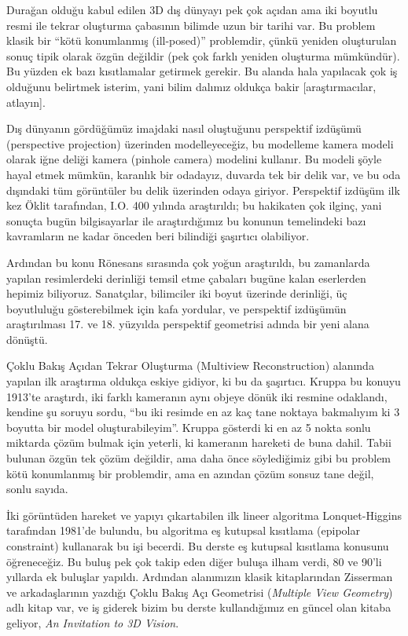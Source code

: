 \documentclass[12pt,fleqn]{article}\usepackage{../../common}
\begin{document}
Durağan olduğu kabul edilen 3D dış dünyayı pek çok açıdan ama iki boyutlu
resmi ile tekrar oluşturma çabasının bilimde uzun bir tarihi var. Bu
problem klasik bir ``kötü konumlanmış (ill-posed)'' problemdir, çünkü
yeniden oluşturulan sonuç tipik olarak özgün değildir (pek çok farklı
yeniden oluşturma mümkündür). Bu yüzden ek bazı kısıtlamalar getirmek
gerekir. Bu alanda hala yapılacak çok iş olduğunu belirtmek isterim, yani
bilim dalımız oldukça bakir [araştırmacılar, atlayın]. 

Dış dünyanın gördüğümüz imajdaki nasıl oluştuğunu perspektif izdüşümü
(perspective projection) üzerinden modelleyeceğiz, bu modelleme kamera modeli
olarak iğne deliği kamera (pinhole camera) modelini kullanır. Bu modeli şöyle
hayal etmek mümkün, karanlık bir odadayız, duvarda tek bir delik var, ve bu oda
dışındaki tüm görüntüler bu delik üzerinden odaya giriyor. Perspektif izdüşüm
ilk kez Öklit tarafından, I.O. 400 yılında araştırıldı; bu hakikaten çok ilginç,
yani sonuçta bugün bilgisayarlar ile araştırdığımız bu konunun temelindeki bazı
kavramların ne kadar önceden beri bilindiği şaşırtıcı olabiliyor.

Ardından bu konu Rönesans sırasında çok yoğun araştırıldı, bu zamanlarda
yapılan resimlerdeki derinliği temsil etme çabaları bugüne kalan eserlerden
hepimiz biliyoruz. Sanatçılar, bilimciler iki boyut üzerinde derinliği, üç
boyutluluğu gösterebilmek için kafa yordular, ve perspektif izdüşümün
araştırılması 17. ve 18. yüzyılda perspektif geometrisi adında bir yeni alana
dönüştü.

Çoklu Bakış Açıdan Tekrar Oluşturma (Multiview Reconstruction) alanında
yapılan ilk araştırma oldukça eskiye gidiyor, ki bu da şaşırtıcı. Kruppa bu
konuyu 1913'te araştırdı, iki farklı kameranın aynı objeye dönük iki
resmine odaklandı, kendine şu soruyu sordu, ``bu iki resimde en az kaç tane
noktaya bakmalıyım ki 3 boyutta bir model oluşturabileyim''. Kruppa
gösterdi ki en az 5 nokta sonlu miktarda çözüm bulmak için yeterli, ki
kameranın hareketi de buna dahil. Tabii bulunan özgün tek çözüm değildir,
ama daha önce söylediğimiz gibi bu problem kötü konumlanmış bir problemdir,
ama en azından çözüm sonsuz tane değil, sonlu sayıda.

İki görüntüden hareket ve yapıyı çıkartabilen ilk lineer algoritma
Lonquet-Higgins tarafından 1981'de bulundu, bu algoritma eş kutupsal
kısıtlama (epipolar constraint) kullanarak bu işi becerdi. Bu derste eş
kutupsal kısıtlama konusunu öğreneceğiz. Bu buluş pek çok takip eden diğer
buluşa ilham verdi, 80 ve 90'li yıllarda ek buluşlar yapıldı. Ardından
alanımızın klasik kitaplarından Zisserman ve arkadaşlarının yazdığı Çoklu
Bakış Açı Geometrisi ({\em Multiple View Geometry}) adlı kitap var, ve iş
giderek bizim bu derste kullandığımız en güncel olan kitaba geliyor, 
{\em An Invitation to 3D Vision}. 
\end{document}

